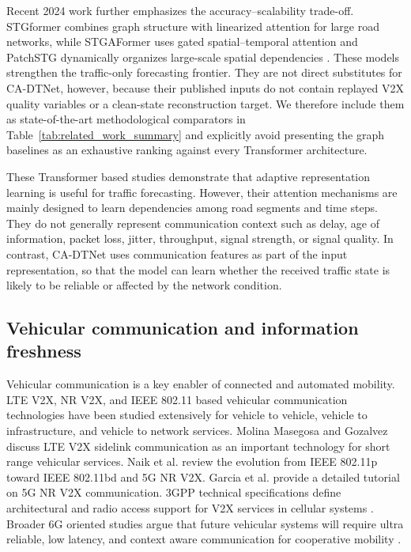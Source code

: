 \documentclass[pdflatex,sn-mathphys-num]{sn-jnl}%
\newenvironment{changed}{}{}
\theoremstyle{thmstyleone}%
\theoremstyle{thmstyletwo}%
\theoremstyle{thmstylethree}%
\begin{document}
\begin{changed}
Recent 2024 work further emphasizes the accuracy--scalability trade-off. STGformer combines graph structure with linearized attention for large road networks, while STGAFormer uses gated spatial--temporal attention and PatchSTG dynamically organizes large-scale spatial dependencies \cite{wang2024stgformer,li2024stgaformer,zhang2024patchstg}. These models strengthen the traffic-only forecasting frontier. They are not direct substitutes for CA-DTNet, however, because their published inputs do not contain replayed V2X quality variables or a clean-state reconstruction target. We therefore include them as state-of-the-art methodological comparators in Table~\ref{tab:related_work_summary} and explicitly avoid presenting the graph baselines as an exhaustive ranking against every Transformer architecture.
\end{changed}

These Transformer based studies demonstrate that adaptive representation learning is useful for traffic forecasting. However, their attention mechanisms are mainly designed to learn dependencies among road segments and time steps. They do not generally represent communication context such as delay, age of information, packet loss, jitter, throughput, signal strength, or signal quality. In contrast, CA-DTNet uses communication features as part of the input representation, so that the model can learn whether the received traffic state is likely to be reliable or affected by the network condition.

\subsection{Vehicular communication and information freshness}

Vehicular communication is a key enabler of connected and automated mobility. LTE V2X, NR V2X, and IEEE 802.11 based vehicular communication technologies have been studied extensively for vehicle to vehicle, vehicle to infrastructure, and vehicle to network services. Molina Masegosa and Gozalvez \cite{molinamasegosa2017ltev} discuss LTE V2X sidelink communication as an important technology for short range vehicular services. Naik et al. \cite{naik2019v2x} review the evolution from IEEE 802.11p toward IEEE 802.11bd and 5G NR V2X. Garcia et al. \cite{garcia2021nrv2x} provide a detailed tutorial on 5G NR V2X communication. 3GPP technical specifications define architectural and radio access support for V2X services in cellular systems \cite{3gpp23287,3gpp38300}. Broader 6G oriented studies argue that future vehicular systems will require ultra reliable, low latency, and context aware communication for cooperative mobility \cite{giordani2020toward6g,shafin2020artificialintelligence6g}.
\end{document}
